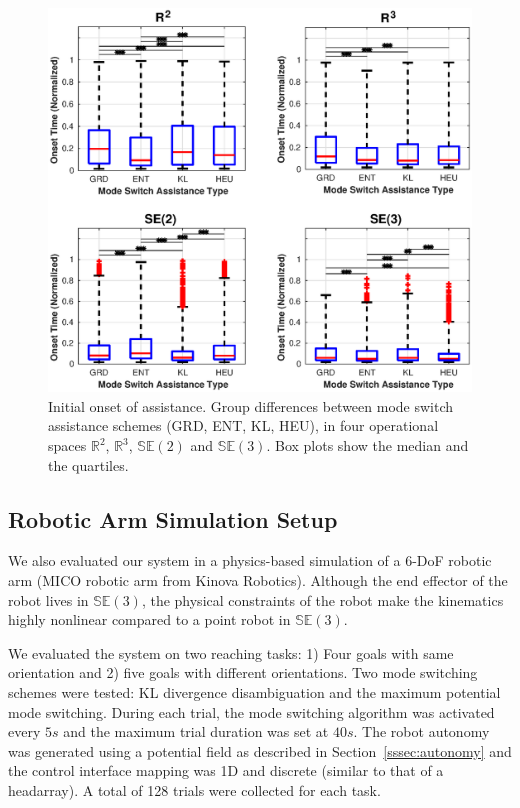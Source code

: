 \documentclass[letterpaper, 10 pt, conference]{ieeeconf}  %
\begin{document}
\begin{figure}[t!]
	\centering
	\includegraphics[width= 1.01\hsize, height=0.3\vsize, center]{./figures/onset_time.eps}
	\vspace{-0.75cm}
	\caption{Initial onset of assistance. Group differences between mode switch assistance schemes (GRD, ENT, KL, HEU), in four operational spaces $\mathbb{R}^2$, $\mathbb{R}^3$, $\mathbb{SE}(2)$ and $\mathbb{SE}(3)$. Box plots show the median and the quartiles.} 
	\label{fig:initial_alpha}
\end{figure}

\subsection{Robotic Arm	 Simulation Setup}
We also evaluated our system in a physics-based simulation of a 6-DoF robotic arm (MICO robotic arm from Kinova Robotics). Although the end effector of the robot lives in $\mathbb{SE}(3)$, the physical constraints of the robot make the kinematics highly nonlinear compared to a point robot in $\mathbb{SE}(3)$. 

We evaluated the system on two reaching tasks: 1) Four goals with same orientation and 2) five goals with different orientations. Two mode switching schemes were tested: KL divergence disambiguation and the maximum potential mode switching. During each trial, the mode switching algorithm was activated every $5s$ and the maximum trial duration was set at $40s$. The robot autonomy was generated using a potential field as described in Section~\ref{sssec:autonomy} and the control interface mapping was 1D and discrete (similar to that of a headarray). A total of 128 trials were collected for each task.
\end{document}
